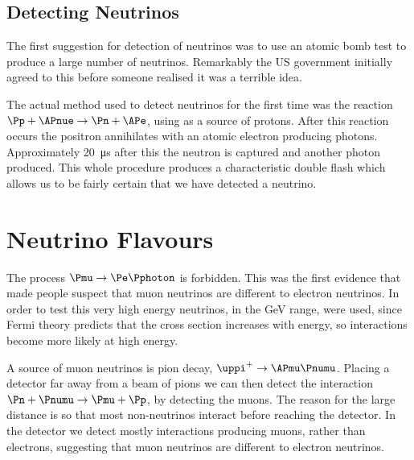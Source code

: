 \documentclass[fleqn]{NotesClass}
\makeatletter
\newcommand{\PBASE@pion}{\uppi}
\newcommand{\Ppiplus}{\ensuremath{\PBASE@pion^+}}
\newcommand{\Ppip}{\Ppiplus}
\makeatother
\begin{document}
    \subsection{Detecting Neutrinos}
    The first suggestion for detection of neutrinos was to use an atomic bomb test to produce a large number of neutrinos.
    Remarkably the US government initially agreed to this before someone realised it was a terrible idea.
    
    The actual method used to detect neutrinos for the first time was the reaction \(\Pp + \APnue \to \Pn + \APe\), using  as a source of protons.
    After this reaction occurs the positron annihilates with an atomic electron producing photons.
    Approximately \qty{20}{\micro\second} after this the neutron is captured and another photon produced.
    This whole procedure produces a characteristic double flash which allows us to be fairly certain that we have detected a neutrino.
    
    \section{Neutrino Flavours}
    The process \(\Pmu \to \Pe \Pphoton\) is forbidden.
    This was the first evidence that made people suspect that muon neutrinos are different to electron neutrinos.
    In order to test this very high energy neutrinos, in the \unit{\giga\electronvolt} range, were used, since Fermi theory predicts that the cross section increases with energy, so interactions become more likely at high energy.
    
    A source of muon neutrinos is pion decay, \(\Ppip \to \APmu\Pnumu\).
    Placing a detector far away from a beam of pions we can then detect the interaction \(\Pn + \Pnumu \to \Pmu + \Pp\), by detecting the muons.
    The reason for the large distance is so that most non-neutrinos interact before reaching the detector.
    In the detector we detect mostly interactions producing muons, rather than electrons, suggesting that muon neutrinos are different to electron neutrinos.
    
\end{document}
